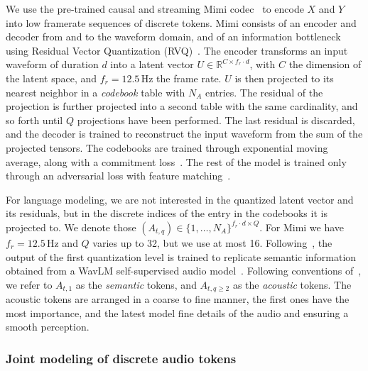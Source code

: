 We use the pre-trained causal and streaming Mimi codec~\citep{moshi} to encode $X$ and $Y$ into low framerate sequences of discrete tokens.
Mimi consists of an encoder and decoder from and to the waveform domain, and of an information bottleneck using Residual Vector Quantization (RVQ)~\cite{soundstream}. The encoder transforms an input waveform of duration $d$ into a latent vector $U \in \mathbb{R}^{C \times f_r \cdot d}$,
with $C$ the dimension of the latent space, and $f_r = 12.5\,\mathrm{Hz}$ the frame rate. 
$U$ is then projected to its nearest neighbor in a \emph{codebook} table with $N_A$ entries. The residual of the projection is further projected into a second
table with the same cardinality, and so forth until $Q$ projections have been performed. The last residual is discarded, and the decoder is trained to reconstruct the input waveform from the sum of the projected tensors.
The codebooks are trained through exponential moving average, along with a commitment loss~\citep{vqvae}. The rest of the model is trained only through an adversarial loss with feature matching~\citep{moshi}.

For language modeling, we are not interested in the quantized latent vector and its residuals, but in the discrete
indices of the entry in the codebooks it is projected to. We denote those $(A_{t, q}) \in \{1, \ldots, N_A\}^{f_r \cdot d \times Q}$.
For Mimi we have $f_r = 12.5 \,\text{Hz}$ and $Q$ varies up to 32, but we use at most 16. 
Following~\citet{zhang2024speechtokenizer,moshi}, the output
of the first quantization level is trained to replicate semantic information
obtained from a WavLM self-supervised audio model~\citep{wavlm}.
Following conventions of~\citet{audiolm}, we refer to $A_{t, 1}$ as the \emph{semantic} tokens, and $A_{t, q \geq 2}$ as the \emph{acoustic} tokens. The acoustic tokens are arranged in a coarse to fine manner, the first ones have the most importance, and the latest model fine details of the audio and ensuring a smooth perception.

\subsubsection{Joint modeling of discrete audio tokens}

